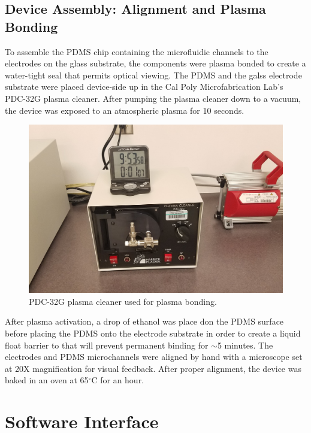 \subsection{Device Assembly: Alignment and Plasma Bonding}

\par To assemble the PDMS chip containing the microfluidic channels to the electrodes on the glass substrate, the components were plasma bonded to create a water-tight seal that permits optical viewing. The PDMS and the galss electrode substrate were placed device-side up in the Cal Poly Microfabrication Lab's PDC-32G plasma cleaner. After pumping the plasma cleaner down to a vacuum, the device was exposed to an atmospheric plasma for 10 seconds.  

\begin{figure}
    \centering
    \includegraphics[width=\textwidth]{images/plasma_cleaner.jpg}
    \caption[PDC-32G plasma cleaner]{PDC-32G plasma cleaner used for plasma bonding.}
    \label{fig:my_label}
\end{figure}

\par After plasma activation, a drop of ethanol was place don the PDMS surface before placing the PDMS onto the electrode substrate in order to create a liquid float barrier to that will prevent permanent binding for $\sim$5 minutes. The electrodes and PDMS microchannels were aligned by hand with a microscope set at 20X magnification for visual feedback. After proper alignment, the device was baked in an oven at 65$^\circ$C for an hour. 



\section[Software]{Software Interface}


